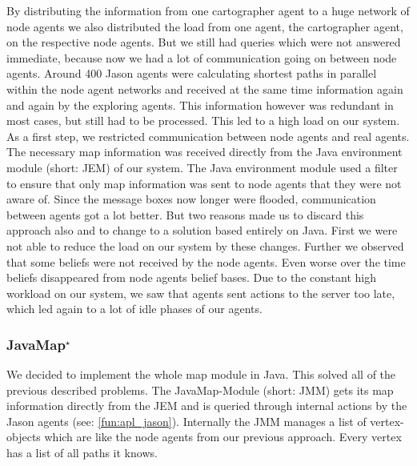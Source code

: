 By distributing the information from one cartographer agent to a huge network of node agents we also distributed the load from one agent, the cartographer agent, on the respective node agents. But we still had queries which were not answered immediate, because now we had a lot of communication going on between node agents. Around 400 Jason agents were calculating shortest paths in parallel within the node agent networks and received at the same time information again and again by the exploring agents. This information however was redundant in most cases, but still had to be processed. This led to a high load on our system. As a first step, we restricted communication between node agents and real agents. The necessary map information was received directly from the Java environment module (short: JEM) of our system. The Java environment module used a filter to ensure that only map information was sent to node agents that they were not aware of. Since the message boxes now longer were flooded, communication between agents got a lot better. But two reasons made us to discard this approach also and to change to a solution based entirely on Java. First we were not able to reduce the load on our system by these changes. Further we observed that some beliefs were not received by the node agents. Even worse over the time beliefs disappeared from node agents belief bases. Due to the constant high workload on our system, we saw that agents sent actions to the server too late, which led again to a lot of idle phases of our agents.

\subsubsection[JavaMap]{JavaMap$^\star$}\label{alg:map_javamap}
We decided to implement the whole map module in Java. This solved all of the previous described problems. The JavaMap-Module (short: JMM) gets its map information directly from the JEM and is queried through internal actions by the Jason agents (see: \autoref{fun:apl_jason}). Internally the JMM manages a list of vertex-objects which are like the node agents from our previous approach. Every vertex has a list of all paths it knows. 